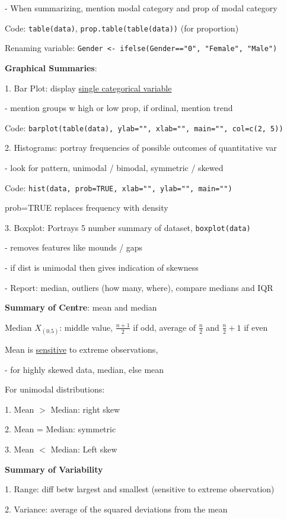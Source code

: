 \documentclass[10pt, a4paper]{article}
\newcommand{\tab}[0]{\hspace*{2mm}}
\begin{document}
\begin{multicols*}{3}
		\tab{} - When summarizing, mention modal category and prop of modal category

		Code: \texttt{table(data)}, \texttt{prop.table(table(data))} (for proportion)

		Renaming variable: \texttt{Gender <- ifelse(Gender=="0", "Female", "Male")}

		\textbf{Graphical Summaries}:

		1. Bar Plot: display \underline{single categorical variable}

		\tab{} - mention groups w high or low prop, if ordinal, mention trend

		Code: \texttt{barplot(table(data), ylab="", xlab="", main="", col=c(2, 5))}

		2. Histograms: portray frequencies of possible outcomes of quantitative var

		\tab{} - look for pattern, unimodal / bimodal, symmetric / skewed

		Code: \texttt{hist(data, prob=TRUE, xlab="", ylab="", main="")}

		prob=TRUE replaces frequency with density

		3. Boxplot: Portrays 5 number summary of dataset, \texttt{boxplot(data)}

		\tab{} - removes features like mounds / gaps

		\tab{} - if dist is unimodal then gives indication of skewness

		\tab{} - Report: median, outliers (how many, where), compare medians and IQR 

		\textbf{Summary of Centre}: mean and median

		Median $X_{(0.5)}$: middle value, $\frac{n + 1}{2}$ if odd, average of $\frac{n}{2}$ and $\frac{n}{2} + 1$ if even

		Mean is \underline{sensitive} to extreme observations, 
		
		\tab{} - for highly skewed data, median, else mean

		For unimodal distributions:

		1. Mean $>$ Median: right skew

		2. Mean = Median: symmetric

		3. Mean $<$ Median: Left skew

		\textbf{Summary of Variability}

		1. Range: diff betw largest and smallest (sensitive to extreme observation)

		2. Variance: average of the squared deviations from the mean


\end{multicols*}
\end{document}

